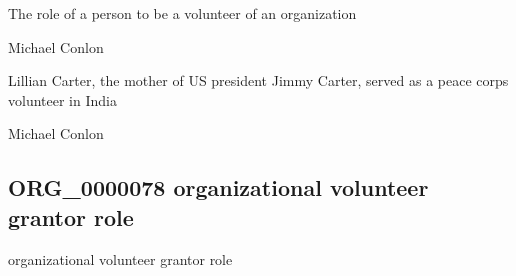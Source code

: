 \documentclass[letterpaper,10pt,english]{sphinxmanual}
\begin{document}
\begin{sphinxShadowBox}

\sphinxAtStartPar
{\hyperref[\detokenize{doc-BFO_0000023::doc}]{}}
\end{sphinxShadowBox}

\begin{sphinxShadowBox}

\sphinxAtStartPar
The role of a person to be a volunteer of an organization
\end{sphinxShadowBox}

\begin{sphinxShadowBox}

\sphinxAtStartPar
Michael Conlon 
\end{sphinxShadowBox}

\begin{sphinxShadowBox}

\sphinxAtStartPar
Lillian Carter, the mother of US president Jimmy Carter, served as a peace corps volunteer in India
\end{sphinxShadowBox}

\begin{sphinxShadowBox}

\sphinxAtStartPar
Michael Conlon 
\end{sphinxShadowBox}
\begin{quote}

\ignorespaces \end{quote}


\subsection{ORG\_0000078 \sphinxhyphen{} organizational volunteer grantor role}
\label{\detokenize{doc-ORG_0000078:org-0000078-organizational-volunteer-grantor-role}}\label{\detokenize{doc-ORG_0000078:index-0}}\label{\detokenize{doc-ORG_0000078::doc}}
\begin{sphinxShadowBox}

\sphinxAtStartPar
organizational volunteer grantor role
\end{sphinxShadowBox}
\end{document}
